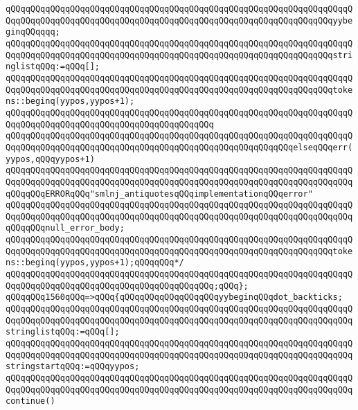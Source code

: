\verb|qQQqqQQqqQQqqQQqqQQqqQQqqQQqqQQqqQQqqQQqqQQqqQQqqQQqqQQqqQQqqQQqqQQqqQQqqQQqqQQqqQQqqQQqqQQqqQQqqQQqqQQqqQQqqQQqqQQqqQQqqQQqqQQqqQQqqQQqyybeginqQQqqqq;|\newline
\verb|qQQqqQQqqQQqqQQqqQQqqQQqqQQqqQQqqQQqqQQqqQQqqQQqqQQqqQQqqQQqqQQqqQQqqQQqqQQqqQQqqQQqqQQqqQQqqQQqqQQqqQQqqQQqqQQqqQQqqQQqqQQqqQQqqQQqqQQqstringlistqQQq:=qQQq[];|\newline
\verb|qQQqqQQqqQQqqQQqqQQqqQQqqQQqqQQqqQQqqQQqqQQqqQQqqQQqqQQqqQQqqQQqqQQqqQQqqQQqqQQqqQQqqQQqqQQqqQQqqQQqqQQqqQQqqQQqqQQqqQQqqQQqqQQqqQQqqQQqtokens::beginq(yypos,yypos+1);|\newline
\verb|qQQqqQQqqQQqqQQqqQQqqQQqqQQqqQQqqQQqqQQqqQQqqQQqqQQqqQQqqQQqqQQqqQQqqQQqqQQqqQQqqQQqqQQqqQQqqQQqqQQqqQQqqQQqqQQq|\newline
\verb|qQQqqQQqqQQqqQQqqQQqqQQqqQQqqQQqqQQqqQQqqQQqqQQqqQQqqQQqqQQqqQQqqQQqqQQqqQQqqQQqqQQqqQQqqQQqqQQqqQQqqQQqqQQqqQQqqQQqqQQqqQQqqQQqelseqQQqerr(yypos,qQQqyypos+1)|\newline
\verb|qQQqqQQqqQQqqQQqqQQqqQQqqQQqqQQqqQQqqQQqqQQqqQQqqQQqqQQqqQQqqQQqqQQqqQQqqQQqqQQqqQQqqQQqqQQqqQQqqQQqqQQqqQQqqQQqqQQqqQQqqQQqqQQqqQQqqQQqqQQqqQQqqQQqERRORqQQq"smlnj_antiquotesqQQqimplementationqQQqerror"|\newline
\verb|qQQqqQQqqQQqqQQqqQQqqQQqqQQqqQQqqQQqqQQqqQQqqQQqqQQqqQQqqQQqqQQqqQQqqQQqqQQqqQQqqQQqqQQqqQQqqQQqqQQqqQQqqQQqqQQqqQQqqQQqqQQqqQQqqQQqqQQqqQQqqQQqqQQqnull_error_body;|\newline
\verb|qQQqqQQqqQQqqQQqqQQqqQQqqQQqqQQqqQQqqQQqqQQqqQQqqQQqqQQqqQQqqQQqqQQqqQQqqQQqqQQqqQQqqQQqqQQqqQQqqQQqqQQqqQQqqQQqqQQqqQQqqQQqqQQqqQQqqQQqtokens::beginq(yypos,yypos+1);qQQqqQQq*/|\newline
\verb|qQQqqQQqqQQqqQQqqQQqqQQqqQQqqQQqqQQqqQQqqQQqqQQqqQQqqQQqqQQqqQQqqQQqqQQqqQQqqQQqqQQqqQQqqQQqqQQqqQQqqQQqqQQqqQQq;qQQq};|\newline
\verb|qQQqqQQq1560qQQq=>qQQq{qQQqqQQqqQQqqQQqqQQqyybeginqQQqdot_backticks;|\newline
\verb|qQQqqQQqqQQqqQQqqQQqqQQqqQQqqQQqqQQqqQQqqQQqqQQqqQQqqQQqqQQqqQQqqQQqqQQqqQQqqQQqqQQqqQQqqQQqqQQqqQQqqQQqqQQqqQQqqQQqqQQqqQQqqQQqqQQqqQQqqQQqstringlistqQQq:=qQQq[];|\newline
\verb|qQQqqQQqqQQqqQQqqQQqqQQqqQQqqQQqqQQqqQQqqQQqqQQqqQQqqQQqqQQqqQQqqQQqqQQqqQQqqQQqqQQqqQQqqQQqqQQqqQQqqQQqqQQqqQQqqQQqqQQqqQQqqQQqqQQqqQQqqQQqstringstartqQQq:=qQQqyypos;|\newline
\verb|qQQqqQQqqQQqqQQqqQQqqQQqqQQqqQQqqQQqqQQqqQQqqQQqqQQqqQQqqQQqqQQqqQQqqQQqqQQqqQQqqQQqqQQqqQQqqQQqqQQqqQQqqQQqqQQqqQQqqQQqqQQqqQQqqQQqqQQqqQQqcontinue()|\newline
